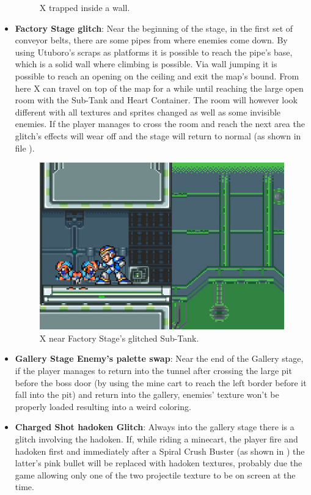 \begin{itemize}
\begin{figure}[htp]
		\caption{X trapped inside a wall.}
	\end{figure}
	\item \textbf{Factory Stage glitch}: Near the beginning of the stage,  in the first set of conveyor belts, there are some pipes from where enemies come down. By using Utuboro's scraps as platforms it is possible to reach the pipe's base, which is a solid wall where climbing is possible. Via wall jumping it is possible to reach an opening on the ceiling and exit the map's bound. From here X can travel on top of the map for a while until reaching the large open room with the Sub-Tank and Heart Container. The room will however look different with all textures and sprites changed as well as some invisible enemies. If the player manages to cross the room and reach the next area the glitch's effects will wear off and the stage will return to normal (as shown in file ).
	\begin{figure}[htp]
		\centering
		\includegraphics[width=0.5\linewidth]{figures/X1/Miscs/Factory_glitch_heart.jpg}
		\caption{X near Factory Stage's glitched Sub-Tank.}
	\end{figure}
	\item \textbf{Gallery Stage Enemy's palette swap}: Near the end of the Gallery stage, if the player manages to return into the tunnel after crossing the large pit before the boss door (by using the mine cart to reach the left border before it fall into the pit) and return into the gallery, enemies' texture won't be properly loaded resulting into a weird coloring.
	\item \textbf{Charged Shot hadoken Glitch}: Always into the gallery stage there is a glitch involving the hadoken. If, while riding a minecart, the player fire and hadoken first and immediately after a Spiral Crush Buster (as shown in ) the latter's pink bullet will be replaced with hadoken textures, probably due the game allowing only one of the two projectile texture to be on screen at the time.
	\begin{figure}[htp]

\end{figure}
\end{itemize}
